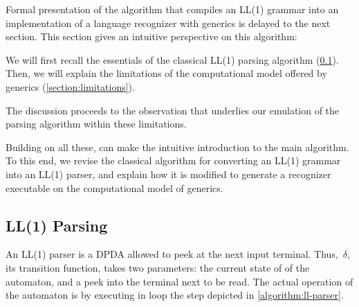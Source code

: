 Formal presentation of the algorithm that compiles an LL(1) grammar into an implementation of a
  language recognizer with \Java generics
  is delayed to the next section.
This section gives an intuitive perspective on this algorithm:

We will first recall the essentials of the classical LL(1) parsing algorithm (\cref{section:essentials}).
Then, we will explain the limitations of the computational model
offered by \Java generics (\cref{section:limitations}).

The discussion proceeds to the observation
  that underlies our emulation of the parsing algorithm
  within these limitations.

Building on all these,  can
  make the intuitive introduction to the main algorithm.
To this end, we revise the classical algorithm for converting
  an LL(1) grammar into an LL(1) parser, and explain
  how it is modified to generate a recognizer executable
  on the computational model of \Java generics.

\subsection{LL(1) Parsing}
\label{section:essentials}
An LL(1) parser is a DPDA allowed to peek at the next input terminal.
Thus,~$δ$, its transition function, takes two parameters: the current state of
of the automaton, and a peek into the terminal next to be read.
The actual operation of the automaton
  is by executing in loop the step
  depicted in \cref{algorithm:ll-parser}.

